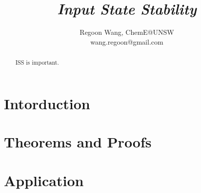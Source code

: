 \documentclass[12pt]{paper}
\begin{document}
 
\title{\textbf{\textit{Input State Stability}}}
\author{Regoon Wang, ChemE@UNSW \\ wang.regoon@gmail.com} 


\maketitle
\begin{abstract}
ISS is important.
\end{abstract} 

\tableofcontents
\section{Intorduction}
\section{Theorems and Proofs}
\section{Application}
 
\end{document}

